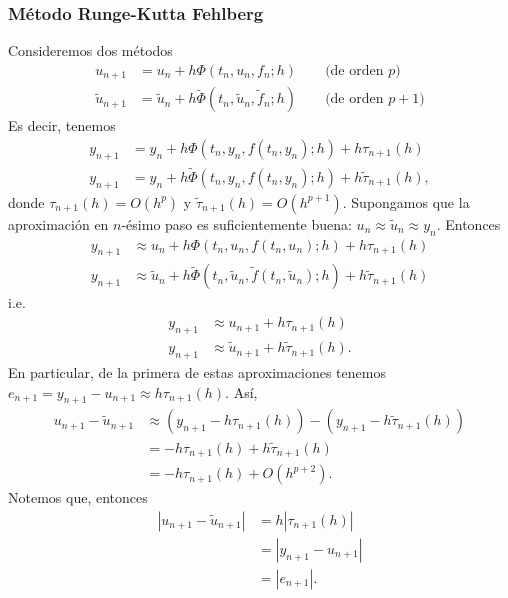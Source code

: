 \documentclass[11pt,letterpaper]{report}
\begin{document}
\subsubsection{Método Runge-Kutta Fehlberg}
Consideremos dos métodos
\begin{align}
  u_{n+1}
    &= u_n + h\Phi(t_n,u_n,f_n;h)
    \qquad
    \text{(de orden $p$)} \\
  \tilde u_{n+1}
    &= \tilde u_n
    + h\tilde \Phi(t_n,\tilde u_n,\tilde f_n;h)
    \qquad
    \text{(de orden $p+1$)}
\end{align}
Es decir, tenemos
\begin{align}
  y_{n+1}
  &=
  y_n
  +
  h
  \Phi(t_n,y_n,f(t_n,y_n);h)
  + h\tau_{n+1}(h)
  \\
  y_{n+1}
  &=
  y_n
  +
  h
  \tilde \Phi(t_n,y_n,f(t_n,y_n);h)
  + h\tilde\tau_{n+1}(h)
,\end{align}
donde $\tau_{n+1}(h) = O(h^p)$ y $\tilde \tau_{n+1}(h) = O(h^{p+1})$.
Supongamos que la aproximación en $n$-ésimo paso es suficientemente
buena: $u_n\approx\tilde u_{n}\approx y_n$. Entonces
\begin{align}
  y_{n+1}
    &\approx
    u_n
    + h\Phi(t_n,u_n,f(t_n,u_n);h)
    + h\tau_{n+1}(h)
  \\
  y_{n+1}
    &\approx
    \tilde u_n
    + h\tilde \Phi(t_n,\tilde u_n,\tilde f(t_n,\tilde u_n);h)
    + h \tilde\tau_{n+1}(h)
\end{align}
i.e.
\begin{align}
  y_{n+1}
    &\approx
    u_{n+1}
    + h\tau_{n+1}(h)
  \\
  y_{n+1}
    &\approx
    \tilde u_{n+1}
    + h\tilde\tau_{n+1}(h)
.\end{align}
En particular, de la primera de estas aproximaciones
tenemos $e_{n+1} = y_{n+1} - u_{n+1} \approx h \tau_{n+1}(h)$. Así,
\begin{align}
  u_{n+1} - \tilde u_{n+1}
  &\approx (y_{n+1} - h\tau_{n+1}(h)) - (y_{n+1} -
  h\tilde\tau_{n+1}(h))
  \\
  &= - h\tau_{n+1}(h) + h\tilde\tau_{n+1}(h) \\
  &= - h\tau_{n+1}(h) + O(h^{p+2}).
\end{align}
Notemos que, entonces
\begin{align}
  |u_{n+1} - \tilde u_{n+1}|
  &= h|\tau_{n+1}(h)| \\
  &= |y_{n+1} - u_{n+1}| \\
  &= |e_{n+1}|.
\end{align}
\end{document}
